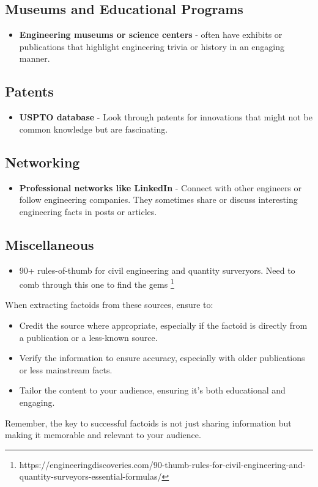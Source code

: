 \documentclass[11pt,letterpaper]{article}
\begin{document}
\subsection*{Museums and Educational Programs}
\begin{itemize}
	\item \textbf{Engineering museums or science centers} - often have exhibits or publications that highlight engineering trivia or history in an engaging manner.
\end{itemize}

\subsection*{Patents}
\begin{itemize}
	\item \textbf{USPTO database} - Look through patents for innovations that might not be common knowledge but are fascinating.
\end{itemize}

\subsection*{Networking}
\begin{itemize}
\item \textbf{Professional networks like LinkedIn} - Connect with other engineers or follow engineering companies. They sometimes share or discuss interesting engineering facts in posts or articles.
\end{itemize}

\subsection*{Miscellaneous}
\begin{itemize}
	\item 90+ rules-of-thumb for civil engineering and quantity surveryors. Need to comb through this one to find the gems \footnote{https://engineeringdiscoveries.com/90-thumb-rules-for-civil-engineering-and-quantity-surveyors-essential-formulas/}
\end{itemize}

When extracting factoids from these sources, ensure to:
\begin{itemize}
\item Credit the source where appropriate, especially if the factoid is directly from a publication or a less-known source.
\item Verify the information to ensure accuracy, especially with older publications or less mainstream facts.
\item Tailor the content to your audience, ensuring it's both educational and engaging.
\end{itemize}
Remember, the key to successful factoids is not just sharing information but making it memorable and relevant to your audience.
\end{document}
